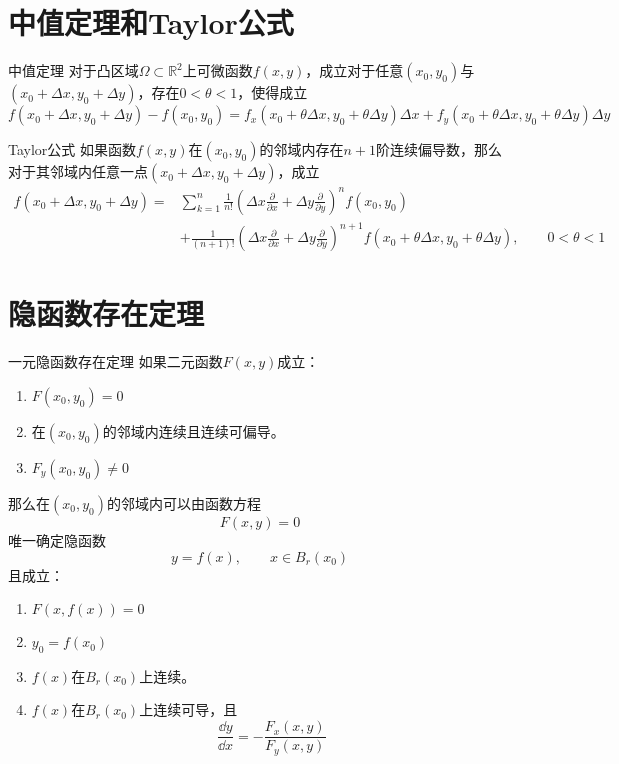 \documentclass[lang = cn, scheme = chinese, thmcnt = section]{elegantbook}
\newcommand{\R}{\mathbb{R}}            %
\newcommand{\sub}{\subset}             %
\begin{document}
\section{中值定理和Taylor公式}

\begin{theorem}{中值定理}
	对于凸区域$\Omega\sub\R^2$上可微函数$f(x,y)$，成立对于任意$(x_0,y_0)$与$(x_0+\Delta x,y_0+\Delta y)$，存在$0<\theta <1$，使得成立
	$$
	f(x_0+\Delta x,y_0+\Delta y)-f(x_0,y_0)
	=f_x(x_0+\theta\Delta x,y_0+\theta\Delta y)\Delta x
	+f_y(x_0+\theta\Delta x,y_0+\theta\Delta y)\Delta y
	$$
\end{theorem}

\begin{theorem}{Taylor公式}
	如果函数$f(x,y)$在$(x_0,y_0)$的邻域内存在$n+1$阶连续偏导数，那么对于其邻域内任意一点$(x_0+\Delta x,y_0+\Delta y)$，成立
	\begin{align*}
		f(x_0+\Delta x,y_0+\Delta y)
		=&\sum_{k=1}^{n}\frac{1}{n!}(\Delta x\frac{\partial}{\partial x}+\Delta y\frac{\partial}{\partial y})^nf(x_0,y_0)\\
		&+
		\frac{1}{(n+1)!}(\Delta x\frac{\partial}{\partial x}+\Delta y\frac{\partial}{\partial y})^{n+1}f(x_0+\theta\Delta x,y_0+\theta\Delta y),\qquad 0<\theta<1
	\end{align*}
\end{theorem}

\section{隐函数存在定理}

\begin{theorem}{一元隐函数存在定理}
	如果二元函数$F(x,y)$成立：
	\begin{enumerate}
		\item $F(x_0,y_0)=0$
		\item 在$(x_0,y_0)$的邻域内连续且连续可偏导。
		\item $F_y(x_0,y_0)\ne 0$
	\end{enumerate}
	那么在$(x_0,y_0)$的邻域内可以由函数方程
	$$
	F(x,y)=0
	$$
	唯一确定隐函数
	$$
	y=f(x),\qquad x\in B_r(x_0)
	$$
	且成立：
	\begin{enumerate}
		\item $F(x,f(x))=0$
		\item $y_0=f(x_0)$
		\item $f(x)$在$B_r(x_0)$上连续。
		\item $f(x)$在$B_r(x_0)$上连续可导，且
		$$
		\frac{\dd y}{\dd x}=-\frac{F_x(x,y)}{F_y(x,y)}
		$$
	\end{enumerate}
\end{theorem}
\end{document}

